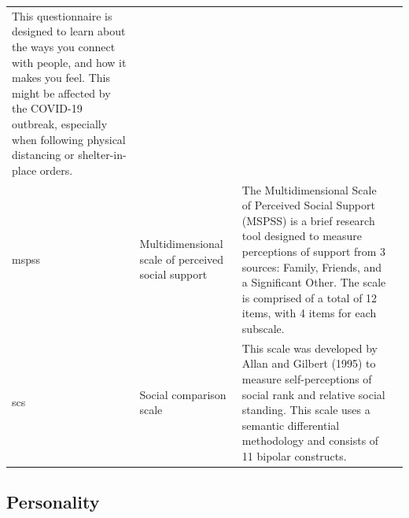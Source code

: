 \documentclass[]{book}
\begin{document}
\begin{longtable}[]{@{}llll@{}}
\begin{minipage}[t]{0.22\columnwidth}
This questionnaire is designed to learn about the ways you connect with people, and how it makes you feel. This might be affected by the COVID-19 outbreak, especially when following physical distancing or shelter-in-place orders.\strut
\end{minipage} & \begin{minipage}[t]{0.18\columnwidth}\raggedright
\strut
\end{minipage}\tabularnewline
\begin{minipage}[t]{0.22\columnwidth}\raggedright
mspss\strut
\end{minipage} & \begin{minipage}[t]{0.27\columnwidth}\raggedright
Multidimensional scale of perceived social support\strut
\end{minipage} & \begin{minipage}[t]{0.22\columnwidth}\raggedright
The Multidimensional Scale of Perceived Social Support (MSPSS) is a brief research tool designed to measure perceptions of support from 3 sources: Family, Friends, and a Significant Other. The scale is comprised of a total of 12 items, with 4 items for each subscale.\strut
\end{minipage} & \begin{minipage}[t]{0.18\columnwidth}\raggedright
\strut
\end{minipage}\tabularnewline
\begin{minipage}[t]{0.22\columnwidth}\raggedright
scs\strut
\end{minipage} & \begin{minipage}[t]{0.27\columnwidth}\raggedright
Social comparison scale\strut
\end{minipage} & \begin{minipage}[t]{0.22\columnwidth}\raggedright
This scale was developed by Allan and Gilbert (1995) to measure self-perceptions of social rank and relative social standing. This scale uses a semantic differential methodology and consists of 11 bipolar constructs.\strut
\end{minipage} & \begin{minipage}[t]{0.18\columnwidth}\raggedright
\strut
\end{minipage}\tabularnewline
\bottomrule
\end{longtable}

\hypertarget{personality-1}{%
\subsection{Personality}\label{personality-1}}
\end{document}
